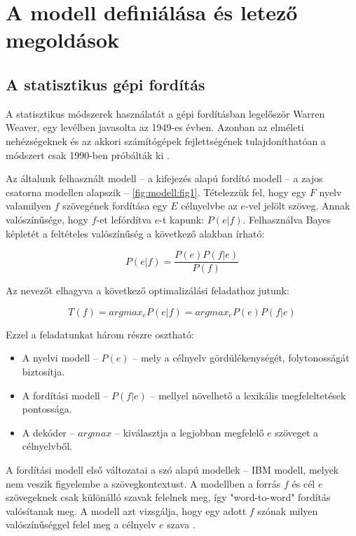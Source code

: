 \section{A modell definiálása és letező megoldások} \label{sec:model_definition}

\subsection{A statisztikus gépi fordítás}

A statisztikus módszerek használatát a gépi fordításban legelőször Warren Weaver, egy levélben javasolta az 1949-es évben. Azonban az elméleti nehézségeknek és az akkori számítógépek fejlettségének tulajdoníthatóan a módszert csak 1990-ben próbálták ki \cite{Brown:1990:SAM:92858.92860}.

Az általunk felhasznált modell -- a kifejezés alapú fordító modell -- a zajos csatorna modellen alapszik -- \ref{fig:modell:fig1}. Tételezzük fel, hogy egy $F$ nyelv valamilyen $f$ szövegének fordítása egy $E$ célnyelvbe az $e$-vel jelölt szöveg. Annak valószínűsége, hogy $f$-et lefórdítva $e$-t kapunk: $P(e|f)$. Felhasználva Bayes képletét a feltételes valószínűség a következő alakban írható:

\begin{equation}
	P(e|f) = \frac{P(e)P(f|e)}{P(f)}
\end{equation}

Az nevezőt elhagyva a következő optimalizálási feladathoz jutunk:

\begin{equation}
	T(f) = argmax_e P(e|f) = argmax_e P(e)P(f|e)
\end{equation} 

Ezzel a feladatunkat három részre osztható: 
\begin{itemize}
	\item
		A nyelvi modell --  $P(e)$ -- mely a célnyelv gördülékenységét, folytonosságát biztosítja.
	\item
		A fordítási modell --  $P(f|e)$ -- mellyel növelhető a lexikális megfeleltetések pontossága.
	\item
		A dekóder -- $argmax$ -- kiválasztja a legjobban megfelelő $e$ szöveget a célnyelvből.
\end{itemize}

A fordítási modell első változatai a szó alapú modellek -- IBM modell, melyek nem veszik figyelembe a szövegkontextust. A modellben a forrás $f$ és cél $e$ szövegeknek csak különálló szavak felelnek meg, így "word-to-word" fordítás valósítanak meg. A modell azt vizsgálja, hogy egy adott $f$ szónak milyen valószínűséggel felel meg a célnyelv $e$ szava \cite{Brown:1990:SAM:92858.92860} \cite{Berger:1994}.

